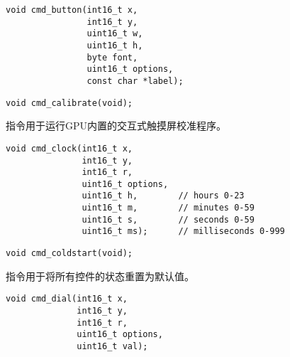 
\begin{framed}
\begin{verbatim}
void cmd_button(int16_t x,
                int16_t y,
                uint16_t w,
                uint16_t h,
                byte font,
                uint16_t options,
                const char *label);
\end{verbatim}
\end{framed}



\begin{framed}
\begin{verbatim}
void cmd_calibrate(void);
\end{verbatim}
\end{framed}

 指令用于运行GPU内置的交互式触摸屏校准程序。



\begin{framed}
\begin{verbatim}
void cmd_clock(int16_t x,
               int16_t y,
               int16_t r,
               uint16_t options,
               uint16_t h,        // hours 0-23
               uint16_t m,        // minutes 0-59
               uint16_t s,        // seconds 0-59
               uint16_t ms);      // milliseconds 0-999
\end{verbatim}
\end{framed}



\begin{framed}
\begin{verbatim}
void cmd_coldstart(void);
\end{verbatim}
\end{framed}

 指令用于将所有控件的状态重置为默认值。


\begin{framed}
\begin{verbatim}
void cmd_dial(int16_t x,
              int16_t y,
              int16_t r,
              uint16_t options,
              uint16_t val);
\end{verbatim}
\end{framed}

